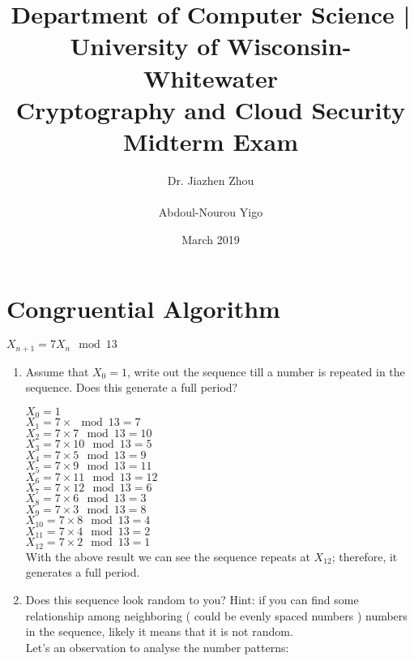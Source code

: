 \documentclass[12]{article}
\title{Department of Computer Science | University of Wisconsin-Whitewater \\
Cryptography and Cloud Security Midterm Exam}
\author{ Dr. Jiazhen Zhou \\ \\
Abdoul-Nourou Yigo
}
\date{March 2019}
\begin{document}

\maketitle

\section{ Congruential Algorithm}

$X_{n+1} = 7X_n \mod 13$

\begin{enumerate}

	\item Assume that $X_0 = 1$, write out the sequence till a number is repeated in the sequence. Does this generate a full period?
	
	$X_0  = 1$ \\
	$X_1  = 7 \times      \mod 13  = 7$ \\
	$X_2  = 7 \times 7    \mod 13  = 10$\\
	$X_3  = 7 \times 10   \mod 13  = 5$ \\
	$X_4  = 7 \times 5    \mod 13  = 9$ \\
	$X_5  = 7 \times 9    \mod 13  = 11$ \\
	$X_6  = 7 \times 11   \mod 13  = 12$ \\
	$X_7  = 7 \times 12   \mod 13  = 6$ \\
	$X_8  = 7 \times 6    \mod 13  = 3$ \\
	$X_9  = 7 \times 3    \mod 13  = 8$ \\
	$X_{10} = 7 \times 8  \mod 13  = 4$ \\
	$X_{11} = 7 \times 4  \mod 13  = 2$ \\
	$X_{12} = 7 \times 2  \mod 13  = 1$ \\
	
	With the above result we can see the sequence repeats at $X_{12}$; therefore, it generates a full period. 
		
	\item  Does this sequence look random to you? Hint: if you can find some relationship among neighboring ( could be evenly spaced numbers ) numbers in the sequence, likely it means that it is not random. \\
	
	Let's an observation to analyse the number patterns: \\
	

\end{enumerate}
\end{document}
